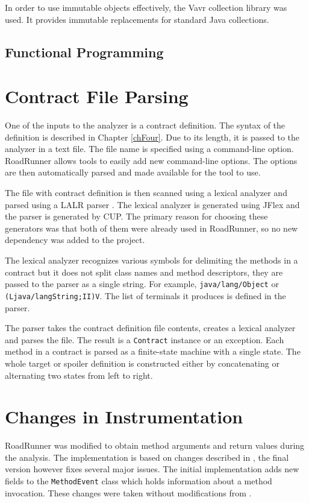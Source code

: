 In order to use immutable objects effectively, the Vavr collection library was
used. It provides immutable replacements for standard Java collections.

\subsection{Functional Programming}
{\color{blue}\lipsum[1]}

{\color{blue}\lipsum[1]}

\section{Contract File Parsing}
One of the inputs to the analyzer is a contract definition. The syntax of the
definition is described in Chapter \ref{chFour}. Due to its length, it is passed
to the analyzer in a text file. The file name is specified using a command-line
option. RoadRunner allows tools to easily add new command-line options. The
options are then automatically parsed and made available for the tool to use.

The file with contract definition is then scanned using a lexical analyzer and
parsed using a LALR parser . The lexical analyzer is
generated using JFlex and the parser is generated by CUP. The primary reason for
choosing these generators was that both of them were already used in RoadRunner,
so no new dependency was added to the project.

The lexical analyzer recognizes various symbols for delimiting the methods in a
contract but it does not split class names and method descriptors, they are
passed to the parser as a single string. For example, \texttt{java/lang/Object}
or \texttt{(Ljava/langString;II)V}. The list of terminals it produces is defined
in the parser.

The parser takes the contract definition file contents, creates a lexical
analyzer and parses the file. The result is a \texttt{Contract} instance or an
exception. Each method in a contract is parsed as a finite-state machine with a
single state. The whole target or spoiler definition is constructed either by
concatenating or alternating two states from left to right.

{\color{blue}\lipsum[1]}

\section{Changes in Instrumentation}
RoadRunner was modified to obtain method arguments and return values during the
analysis. The implementation is based on changes described in \cite{janousek},
the final version however fixes several major issues. The initial implementation
adds new fields to the \texttt{MethodEvent} class which holds information about
a method invocation. These changes were taken without modifications from
\cite{janousek}.

